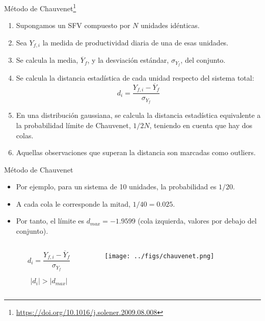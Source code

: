 \documentclass[aspectratio=169, usenames,svgnames,dvipsnames]{beamer}
\begin{document}
\begin{frame}[label={sec:org731c1e5}]{Método de Chauvenet\footnote{\url{https://doi.org/10.1016/j.solener.2009.08.008}}}
\begin{enumerate}
\item Supongamos un SFV compuesto por \(N\) unidades idénticas.
\item Sea \(Y_{f,i}\) la medida de \alert{productividad diaria} de una de esas unidades.
\item Se calcula la \alert{media}, \(\overline{Y}_f\), y la \alert{desviación estándar}, \(\sigma_{Y_f}\), del \alert{conjunto}.
\item Se calcula la \alert{distancia estadística} de cada unidad respecto del sistema total:
\[
d_i = \frac{Y_{f,i} - \overline{Y}_f}{\sigma_{Y_f}}
\]
\item En una distribución gaussiana, se calcula la distancia estadística
equivalente a la probabilidad límite de Chauvenet, \(1/2N\), teniendo en cuenta
que hay dos colas.
\item Aquellas observaciones que superan la distancia son \alert{marcadas como outliers}.
\end{enumerate}
\end{frame}


\begin{frame}[label={sec:org0614079}]{Método de Chauvenet}
\begin{itemize}
\item Por ejemplo, para un sistema de 10 unidades, la probabilidad es \(1/20\).

\item A cada cola le corresponde la mitad, \(1/40 = 0.025\).

\item Por tanto, el límite es \(d_{max} = - 1.9599\) (cola izquierda, valores por debajo del conjunto).
\end{itemize}


\begin{columns}
\begin{column}{0.3\columnwidth}
\[
  d_i = \frac{Y_{f,i} - \overline{Y}_f}{\sigma_{Y_f}}
\]

\[
\left| d_i \right| > \left| d_{max} \right|
\]
\end{column}

\begin{column}{0.8\columnwidth}
\begin{center}
\begin{center}
\texttt{[image: ../figs/chauvenet.png]}
\end{center}
\end{center}
\end{column}
\end{columns}
\end{frame}
\end{document}
